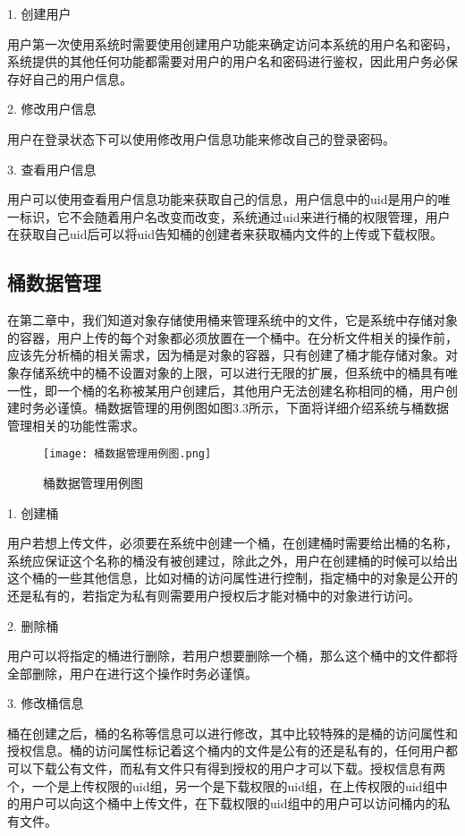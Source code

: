 1. 创建用户

用户第一次使用系统时需要使用创建用户功能来确定访问本系统的用户名和密码，系统提供的其他任何功能都需要对用户的用户名和密码进行鉴权，因此用户务必保存好自己的用户信息。

2. 修改用户信息

用户在登录状态下可以使用修改用户信息功能来修改自己的登录密码。

3. 查看用户信息

用户可以使用查看用户信息功能来获取自己的信息，用户信息中的uid是用户的唯一标识，它不会随着用户名改变而改变，系统通过uid来进行桶的权限管理，用户在获取自己uid后可以将uid告知桶的创建者来获取桶内文件的上传或下载权限。

\subsection{桶数据管理}
在第二章中，我们知道对象存储使用桶来管理系统中的文件，它是系统中存储对象的容器，用户上传的每个对象都必须放置在一个桶中。在分析文件相关的操作前，应该先分析桶的相关需求，因为桶是对象的容器，只有创建了桶才能存储对象。对象存储系统中的桶不设置对象的上限，可以进行无限的扩展，但系统中的桶具有唯一性，即一个桶的名称被某用户创建后，其他用户无法创建名称相同的桶，用户创建时务必谨慎。桶数据管理的用例图如图3.3所示，下面将详细介绍系统与桶数据管理相关的功能性需求。

\begin{figure}[h]
    \centering
    \texttt{[image: 桶数据管理用例图.png]}
    \caption{桶数据管理用例图}
\end{figure}

1. 创建桶

用户若想上传文件，必须要在系统中创建一个桶，在创建桶时需要给出桶的名称，系统应保证这个名称的桶没有被创建过，除此之外，用户在创建桶的时候可以给出这个桶的一些其他信息，比如对桶的访问属性进行控制，指定桶中的对象是公开的还是私有的，若指定为私有则需要用户授权后才能对桶中的对象进行访问。

2. 删除桶

用户可以将指定的桶进行删除，若用户想要删除一个桶，那么这个桶中的文件都将全部删除，用户在进行这个操作时务必谨慎。

3. 修改桶信息

桶在创建之后，桶的名称等信息可以进行修改，其中比较特殊的是桶的访问属性和授权信息。桶的访问属性标记着这个桶内的文件是公有的还是私有的，任何用户都可以下载公有文件，而私有文件只有得到授权的用户才可以下载。授权信息有两个，一个是上传权限的uid组，另一个是下载权限的uid组，在上传权限的uid组中的用户可以向这个桶中上传文件，在下载权限的uid组中的用户可以访问桶内的私有文件。


